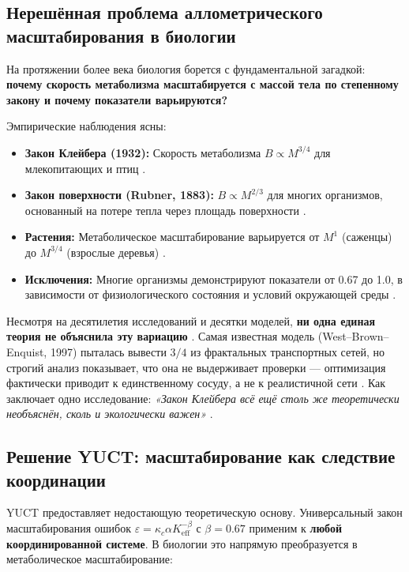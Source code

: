 \documentclass[12pt]{article}
\newcommand{\Keff}{K_{\mathrm{eff}}}
\begin{document}
	\subsection{Нерешённая проблема аллометрического масштабирования в биологии}
	
	На протяжении более века биология борется с фундаментальной загадкой: \textbf{почему скорость метаболизма масштабируется с массой тела по степенному закону и почему показатели варьируются?}
	
	Эмпирические наблюдения ясны:
	\begin{itemize}
		\item \textbf{Закон Клейбера (1932):} Скорость метаболизма \(B \propto M^{3/4}\) для млекопитающих и птиц \cite{Kleiber1932,West1997}.
		\item \textbf{Закон поверхности (Rubner, 1883):} \(B \propto M^{2/3}\) для многих организмов, основанный на потере тепла через площадь поверхности \cite{Rubner1883}.
		\item \textbf{Растения:} Метаболическое масштабирование варьируется от \(M^{1}\) (саженцы) до \(M^{3/4}\) (взрослые деревья) \cite{Reich2006}.
		\item \textbf{Исключения:} Многие организмы демонстрируют показатели от 0.67 до 1.0, в зависимости от физиологического состояния и условий окружающей среды \cite{Glazier2005}.
	\end{itemize}
	
	Несмотря на десятилетия исследований и десятки моделей, \textbf{ни одна единая теория не объяснила эту вариацию} \cite{Agutter2004}. Самая известная модель (West–Brown–Enquist, 1997) пыталась вывести \(3/4\) из фрактальных транспортных сетей, но строгий анализ показывает, что она не выдерживает проверки — оптимизация фактически приводит к единственному сосуду, а не к реалистичной сети \cite{Dodds2001}. Как заключает одно исследование: \textit{«Закон Клейбера всё ещё столь же теоретически необъяснён, сколь и экологически важен»} \cite{Agutter2004}.
	
	\subsection{Решение YUCT: масштабирование как следствие координации}
	
	YUCT предоставляет недостающую теоретическую основу. Универсальный закон масштабирования ошибок \(\varepsilon = \kappa_c \alpha \Keff^{-\beta}\) с \(\beta = 0.67\) применим к \textbf{любой координированной системе}. В биологии это напрямую преобразуется в метаболическое масштабирование:
	
\end{document}
